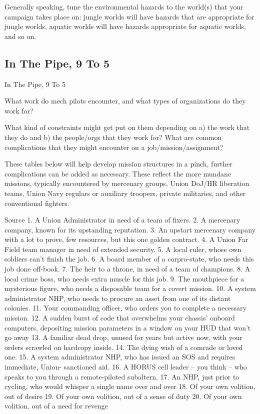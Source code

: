 Generally speaking, tune the environmental hazards to the world(s) that your campaign takes
place on: jungle worlds will have hazards that are appropriate for jungle worlds, aquatic worlds
will have hazards appropriate for aquatic worlds, and so on.



\subsection{In The Pipe, 9 To 5 }

In The Pipe, 9 To 5

What work do mech pilots encounter, and what types of organizations do they work for?

What kind of constraints might get put on them depending on a) the work that they do and b) the
people/orgs that they work for? What are common complications that they might encounter on a
job/mission/assignment?

These tables below will help develop mission structures in a pinch, further complications can be
added as necessary. These reflect the more mundane missions, typically encountered by
mercenary groups, Union DoJ/HR liberation teams, Union Navy regulars or auxiliary troopers,
private militaries, and other conventional fighters.

Source
    1.  A Union Administrator in need of a team of fixers.
    2.  A mercenary company, known for its upstanding reputation.
    3.  An upstart mercenary company with a lot to prove, few resources, but this one golden
        contract.
    4.  A Union Far Field team manager in need of extended security.
    5.  A local ruler, whose own soldiers can’t finish the job.
    6.  A board member of a corpro-state, who needs this job done off-book.
    7.  The heir to a throne, in need of a team of champions.
    8.  A local crime boss, who needs extra muscle for this job.
    9.  The mouthpiece for a mysterious figure, who needs a disposable team for a covert
        mission.
    10. A system administrator NHP, who needs to procure an asset from one of its distant
        colonies.
    11. Your commanding officer, who orders you to complete a necessary mission.
    12. A sudden burst of code that overwhelms your chassis’ onboard computers, depositing
        mission parameters in a window on your HUD that won’t go away
    13. A familiar dead drop, unused for years but active now, with your orders scrawled on
        hardcopy inside.
    14. The dying wish of a comrade or loved one.
    15. A system administrator NHP, who has issued an SOS and requires immediate, Union-
        sanctioned aid.
    16. A HORUS cell leader -- you think -- who speaks to you through a remote-piloted subaltern.
    17. An NHP, just prior to cycling, who would whisper a single name over and over
    18. Of your own volition, out of desire
    19. Of your own volition, out of a sense of duty
    20. Of your own volition, out of a need for revenge

